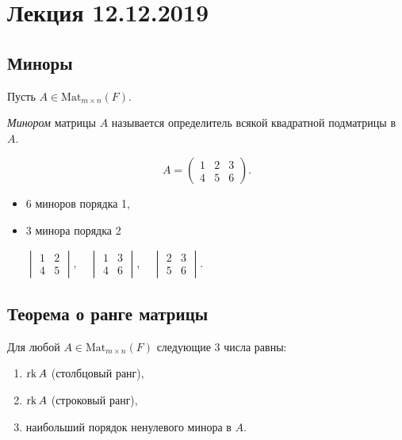 \section{Лекция 12.12.2019}

\subsection{Миноры}

Пусть $A \in \text{Mat}_{m \times n}(F)$.

\begin{definition}
    \textit{Минором} матрицы $A$ называется определитель всякой квадратной подматрицы в $A$.
\end{definition}

\begin{example}
    \begin{equation*}
        A = \begin{pmatrix} 1 & 2 & 3 \\ 4 & 5 & 6 \end{pmatrix}
    .\end{equation*}

    \begin{itemize}
    \item 6 миноров порядка 1,
    \item 3 минора порядка 2

        \begin{math}
            \begin{vmatrix} 1 & 2 \\ 4 & 5 \end{vmatrix}, \quad
            \begin{vmatrix} 1 & 3 \\ 4 & 6 \end{vmatrix}, \quad
            \begin{vmatrix} 2 & 3 \\ 5 & 6 \end{vmatrix}
        .\end{math}
    \end{itemize}
\end{example}


\subsection{Теорема о ранге матрицы}

\begin{theorem}
    Для любой $A \in \text{Mat}_{m \times n}(F)$ следующие 3 числа равны:
    \begin{enumerate}[label=(\arabic*),nosep]
    \item \label{lec14:eq_thm:1} $\operatorname{\mathop{\mathrm{rk}}} A$ (столбцовый ранг),
    \item \label{lec14:eq_thm:2} $\operatorname{\mathop{\mathrm{rk}}} A$ (строковый ранг),
    \item \label{lec14:eq_thm:3} наибольший порядок ненулевого минора в $A$.
    \end{enumerate}
\end{theorem}

